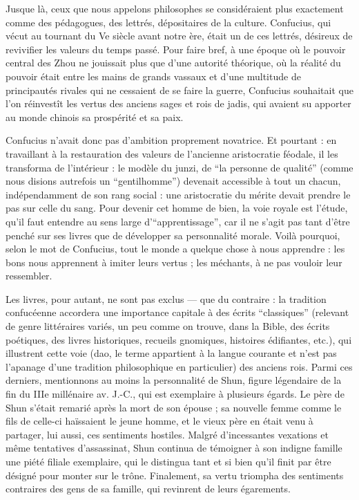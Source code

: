 \documentclass[11pt,a4paper]{article} %
\begin{document}
Jusque là, ceux que nous appelons philosophes se considéraient plus exactement comme
des pédagogues, des lettrés, dépositaires de la culture.
Confucius, qui vécut au
tournant du Ve siècle avant notre ère, était un de ces lettrés, désireux de revivifier les
valeurs du temps passé.
Pour faire bref, à une époque où le pouvoir central des Zhou ne
jouissait plus que d'une autorité théorique, où la réalité du pouvoir était entre les mains de
grands vassaux et d'une multitude de principautés rivales qui ne cessaient de se faire la
guerre, Confucius souhaitait que l'on réinvestît les vertus des anciens sages et rois de
jadis, qui avaient su apporter au monde chinois sa prospérité et sa paix.

Confucius n'avait donc pas d'ambition proprement novatrice.
Et pourtant : en travaillant à
la restauration des valeurs de l'ancienne aristocratie féodale, il les transforma de
l'intérieur : le modèle du junzi, de ``la personne de qualité'' (comme nous disions
autrefois un ``gentilhomme'') devenait accessible à tout un chacun, indépendamment de son
rang social : une aristocratie du mérite devait prendre le pas sur celle du sang.
Pour devenir
cet homme de bien, la voie royale est l'étude, qu'il faut entendre au sens large
d'``apprentissage'', car il ne s'agit pas tant d'être penché sur ses livres que de développer
sa personnalité morale.
Voilà pourquoi, selon le mot de Confucius, tout le monde a
quelque chose à nous apprendre : les bons nous apprennent à imiter leurs vertus ; les
méchants, à ne pas vouloir leur ressembler.

Les livres, pour autant, ne sont pas exclus --- que du contraire : la tradition confucéenne
accordera une importance capitale à des écrits ``classiques'' (relevant de genre littéraires
variés, un peu comme on trouve, dans la Bible, des écrits poétiques, des livres historiques,
recueils gnomiques, histoires édifiantes, etc.), qui illustrent cette voie (dao, le terme
appartient à la langue courante et n'est pas l'apanage d'une tradition philosophique en
particulier) des anciens rois.
Parmi ces derniers, mentionnons au moins la personnalité de
Shun, figure légendaire de la fin du IIIe millénaire av. J.-C., qui est exemplaire à plusieurs
égards.
Le père de Shun s'était remarié après la mort de son épouse ; sa nouvelle femme
comme le fils de celle-ci haïssaient le jeune homme, et le vieux père en était venu à
partager, lui aussi, ces sentiments hostiles.
Malgré d'incessantes vexations et même tentatives
d'assassinat, Shun continua de témoigner à son indigne famille une piété filiale
exemplaire, qui le distingua tant et si bien qu'il finit par être désigné pour monter sur le
trône.
Finalement, sa vertu triompha des sentiments contraires des gens de sa famille, qui
revinrent de leurs égarements.
\end{document}
